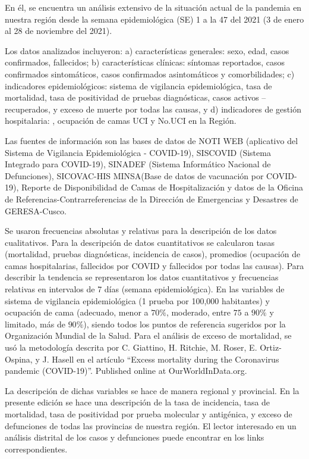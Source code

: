 \documentclass[12pt,a4paper,openany]{book}
\begin{document}
	En él, se encuentra un análisis extensivo de la situación actual de la pandemia en nuestra región desde la semana epidemiológica (SE) 1 a la 47 del 2021 (3 de enero al 28 de noviembre del 2021).
	
	Los datos analizados incluyeron: a) características generales: sexo, edad, casos confirmados, fallecidos; b) características clínicas: síntomas reportados, casos confirmados sintomáticos, casos confirmados asintomáticos y comorbilidades; c) indicadores epidemiológicos: sistema de vigilancia epidemiológica, tasa de mortalidad, tasa de positividad de pruebas diagnósticas, casos activos – recuperados, y exceso de muerte por todas las causas, y d) indicadores de gestión hospitalaria: , ocupación de camas UCI y No.UCI en la Región.
	
	Las fuentes de información son las bases de datos de NOTI WEB (aplicativo del Sistema de Vigilancia Epidemiológica - COVID-19), SISCOVID (Sistema Integrado para COVID-19), SINADEF (Sistema Informático Nacional de Defunciones), SICOVAC-HIS MINSA(Base de datos de vacunación por COVID-19), Reporte de Disponibilidad de Camas de Hospitalización y datos de la Oficina de Referencias-Contrarreferencias de la Dirección de Emergencias y Desastres de GERESA-Cusco. 
	
	Se usaron frecuencias absolutas y relativas para la descripción de los datos cualitativos. Para la descripción de datos cuantitativos se calcularon tasas (mortalidad, pruebas diagnósticas, incidencia de casos), promedios (ocupación de camas hospitalarias, fallecidos por COVID y fallecidos por todas las causas). Para describir la tendencia se representaron los datos cuantitativos y frecuencias relativas en intervalos de 7 días (semana epidemiológica). En las variables de sistema de vigilancia epidemiológica (1 prueba por 100,000 habitantes) y ocupación de cama (adecuado, menor a $70\%$, moderado, entre $75$ a $90\%$ y limitado, más de $90\%$), siendo todos los puntos de referencia sugeridos por la Organización Mundial de la Salud. Para el análisis de exceso de mortalidad, se usó la metodología descrita por C. Giattino, H. Ritchie, M. Roser, E. Ortiz-Ospina, y J. Hasell en el artículo ``Excess mortality during the Coronavirus pandemic (COVID-19)''. Published online at OurWorldInData.org.
	
	La descripción de dichas variables se hace de manera regional y provincial. En la presente edición se hace una descripción de la tasa de incidencia, tasa de mortalidad, tasa de positividad por prueba molecular y antigénica, y exceso de defunciones de todas las provincias de nuestra región. El lector interesado en un análisis distrital de los casos y defunciones puede encontrar en los links correspondientes.
	 
\end{document}
